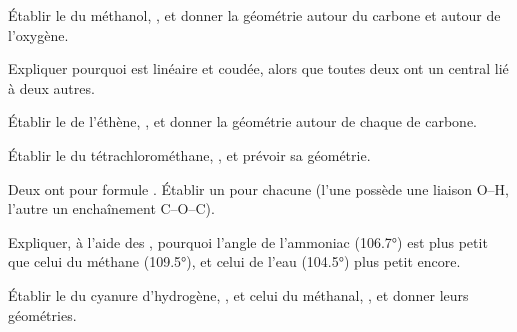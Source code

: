 \begin{exercise}[$\star\star$]\label{exo:g10:lewis-and-shape:8}
Établir le  du méthanol, , et donner la
géométrie autour du carbone et autour de l'oxygène.
\end{exercise}

\begin{exercise}[$\star\star$]\label{exo:g10:lewis-and-shape:9}
Expliquer pourquoi  est linéaire et  coudée, alors que
toutes deux ont un  central lié à deux autres.
\end{exercise}

\begin{exercise}[$\star\star$]\label{exo:g10:lewis-and-shape:10}
Établir le  de l'éthène, , et donner la
géométrie autour de chaque  de carbone.
\end{exercise}

\begin{exercise}[$\star\star$]\label{exo:g10:lewis-and-shape:11}
Établir le  du tétrachlorométhane, , et prévoir
sa géométrie.
\end{exercise}

\begin{exercise}[$\star\star\star$]\label{exo:g10:lewis-and-shape:12}
Deux  ont pour formule . Établir un 
pour chacune (l'une possède une liaison O--H, l'autre un enchaînement
C--O--C).
\end{exercise}

\begin{exercise}[$\star\star\star$]\label{exo:g10:lewis-and-shape:13}
Expliquer, à l'aide des , pourquoi l'angle de
l'ammoniac (\ang{106.7}) est plus petit que celui du méthane
(\ang{109.5}), et celui de l'eau (\ang{104.5}) plus petit encore.
\end{exercise}

\begin{exercise}[$\star\star\star$]\label{exo:g10:lewis-and-shape:14}
Établir le  du cyanure d'hydrogène, , et celui du
méthanal, , et donner leurs géométries.
\end{exercise}

